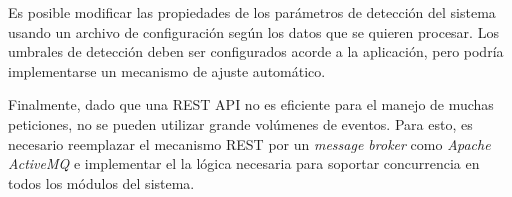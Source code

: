 \documentclass[a4paper,10pt, oneside]{article}
\begin{document}
Es posible modificar las propiedades de los parámetros de detección del sistema usando un archivo de configuración según los datos que se quieren procesar. Los umbrales de detección deben ser configurados acorde a la aplicación, pero podría implementarse un mecanismo de ajuste automático.

Finalmente, dado que una REST API no es eficiente para el manejo de muchas peticiones, no se pueden utilizar grande volúmenes de eventos. Para esto, es necesario reemplazar el mecanismo REST por un \textit{message broker} como \textit{Apache ActiveMQ} e implementar el la lógica necesaria para soportar concurrencia en todos los módulos del sistema.
\newpage
\nocite{*}
\printbibliography
\end{document}
